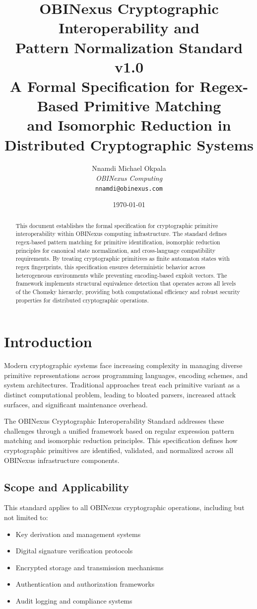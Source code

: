 \documentclass[11pt,a4paper]{article}
\title{
    \textbf{OBINexus Cryptographic Interoperability and\\
    Pattern Normalization Standard v1.0}\\
    \large A Formal Specification for Regex-Based Primitive Matching\\
    and Isomorphic Reduction in Distributed Cryptographic Systems
}
\author{
    Nnamdi Michael Okpala\\
    \textit{OBINexus Computing}\\
    \texttt{nnamdi@obinexus.com}
}
\date{\today}
\begin{document}
\maketitle

\begin{abstract}
This document establishes the formal specification for cryptographic primitive interoperability within OBINexus computing infrastructure. The standard defines regex-based pattern matching for primitive identification, isomorphic reduction principles for canonical state normalization, and cross-language compatibility requirements. By treating cryptographic primitives as finite automaton states with regex fingerprints, this specification ensures deterministic behavior across heterogeneous environments while preventing encoding-based exploit vectors. The framework implements structural equivalence detection that operates across all levels of the Chomsky hierarchy, providing both computational efficiency and robust security properties for distributed cryptographic operations.
\end{abstract}

\tableofcontents
\newpage

\section{Introduction}

Modern cryptographic systems face increasing complexity in managing diverse primitive representations across programming languages, encoding schemes, and system architectures. Traditional approaches treat each primitive variant as a distinct computational problem, leading to bloated parsers, increased attack surfaces, and significant maintenance overhead.

The OBINexus Cryptographic Interoperability Standard addresses these challenges through a unified framework based on regular expression pattern matching and isomorphic reduction principles. This specification defines how cryptographic primitives are identified, validated, and normalized across all OBINexus infrastructure components.

\subsection{Scope and Applicability}

This standard applies to all OBINexus cryptographic operations, including but not limited to:
\begin{itemize}
    \item Key derivation and management systems
    \item Digital signature verification protocols
    \item Encrypted storage and transmission mechanisms
    \item Authentication and authorization frameworks
    \item Audit logging and compliance systems
\end{itemize}
\end{document}
